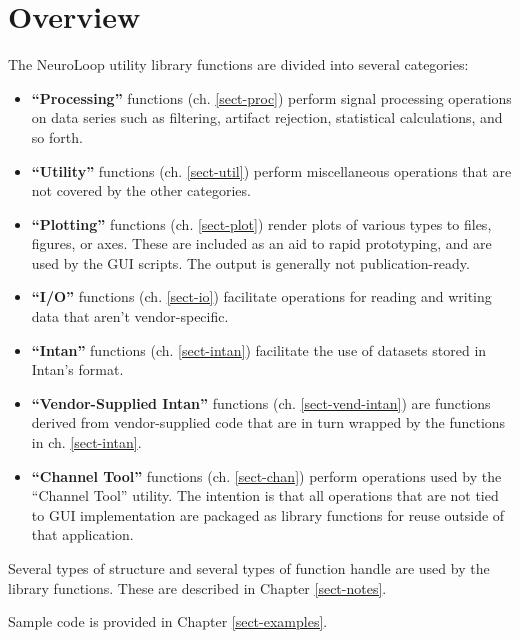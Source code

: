 
\chapter{Overview}
\label{sect-over}

The NeuroLoop utility library functions are divided into several categories:

\begin{itemize}

\item \textbf{``Processing''} functions (ch. \ref{sect-proc}) perform signal
processing operations on data series such as filtering, artifact rejection,
statistical calculations, and so forth.

\item \textbf{``Utility''} functions (ch. \ref{sect-util}) perform
miscellaneous operations that are not covered by the other categories.

\item \textbf{``Plotting''} functions (ch. \ref{sect-plot}) render plots
of various types to files, figures, or axes. These are included as an aid
to rapid prototyping, and are used by the GUI scripts. The output is
generally not publication-ready.

\item \textbf{``I/O''} functions (ch. \ref{sect-io}) facilitate operations
for reading and writing data that aren't vendor-specific.

\item \textbf{``Intan''} functions (ch. \ref{sect-intan}) facilitate the use
of datasets stored in Intan's format.

\item \textbf{``Vendor-Supplied Intan''} functions
(ch. \ref{sect-vend-intan}) are functions derived from vendor-supplied code
that are in turn wrapped by the functions in ch. \ref{sect-intan}.

\item \textbf{``Channel Tool''} functions (ch. \ref{sect-chan}) perform
operations used by the ``Channel Tool'' utility. The intention is that all
operations that are not tied to GUI implementation are packaged as library
functions for reuse outside of that application.

\end{itemize}

Several types of structure and several types of function handle are used by
the library functions. These are described in Chapter \ref{sect-notes}.

Sample code is provided in Chapter \ref{sect-examples}.

%
